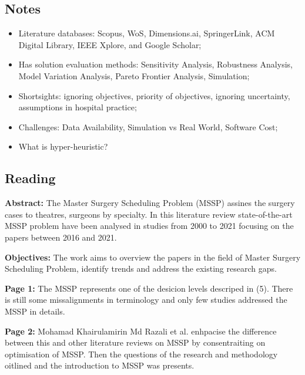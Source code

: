 \subsection{Notes}
    \begin{itemize}
        \item Literature databases: Scopus, WoS, Dimensions.ai, SpringerLink, ACM Digital Library, IEEE Xplore, and Google Scholar;
        \item Has solution evaluation methods: Sensitivity Analysis, Robustness Analysis, Model Variation Analysis, Pareto Frontier Analysis, Simulation;
        \item Shortsights: ignoring objectives, priority of objectives, ignoring uncertainty, assumptions in hospital practice; 
        \item Challenges: Data Availability, Simulation vs Real World, Software Cost;
        \item What is hyper-heuristic?
    \end{itemize}


\subsection{Reading}
    \textbf{Abstract:}
    The Master Surgery Scheduling Problem (MSSP) assines the surgery cases to theatres, surgeons by specialty. In this literature review state-of-the-art MSSP problem have been analysed in studies from 2000 to 2021 focusing on the papers between 2016 and 2021. 
    
    \textbf{Objectives:}
    The work aims to overview the papers in the field of Master Surgery Scheduling Problem, identify trends and address the existing research gaps.

    
    \textbf{Page 1:}
    The MSSP represents one of the desicion levels descriped in (5). There is still some missalignments in terminology and only few studies addressed the MSSP in details.

    \textbf{Page 2:}
    Mohamad Khairulamirin Md Razali et al. enhpacise the difference between this and other literature reviews on MSSP by consentraiting on optimisation of MSSP. Then the questions of the research and methodology oitlined and the introduction to MSSP was presents.

